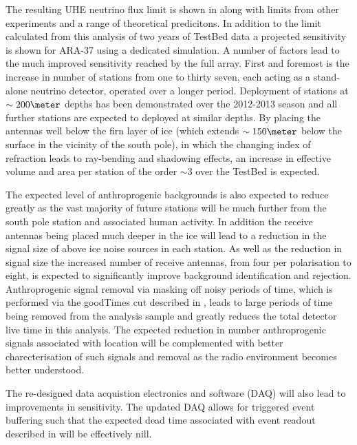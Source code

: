 The resulting UHE neutrino flux limit is shown in  along with limits from other experiments and a range of theoretical predicitons. In addition to the limit calculated from this analysis of two years of TestBed data a projected sensitivity is shown for ARA-37 using a dedicated simulation. A number of factors lead to the much improved sensitivity reached by the full array. First and foremost is the increase in number of stations from one to thirty seven, each acting as a stand-alone neutrino detector, operated over a longer period. Deployment of stations at $\sim 200 \meter$ depths has been demonstrated over the 2012-2013 season and all further stations are expected to deployed at similar depths. By placing the antennas well below the firn layer of ice (which extends $\sim 150 \meter$ below the surface in the vicinity of the south pole), in which the changing index of refraction leads to ray-bending and shadowing effects, an increase in effective volume and area per station of the order $\sim 3$ over the TestBed is expected.

The expected level of anthroprogenic backgrounds is also expected to reduce greatly as the vast majority of future stations will be much further from the south pole station and associated human activity. In addition the receive antennas being placed much deeper in the ice will lead to a reduction in the signal size of above ice noise sources in each station. As well as the reduction in signal size the increased number of receive antennas, from four per polarisation to eight, is expected to significantly improve background identification and rejection. Anthroprogenic signal removal via masking off noisy periods of time, which is performed via the goodTimes cut described in , leads to large periods of time being removed from the analysis sample and greatly reduces the total detector live time in this analysis. The expected reduction in number anthroprogenic signals associated with location will be complemented with better charecterisation of such signals and removal as the radio environment becomes better understood.

The re-designed data acquistion electronics and software (DAQ) will also lead to improvements in sensitivity. The updated DAQ allows for triggered event buffering such that the expected dead time associated with event readout described in  will be effectively nill. 







